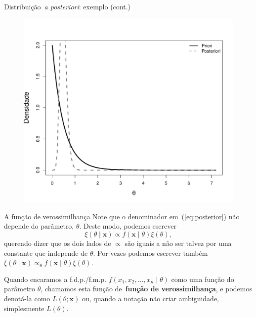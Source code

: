 \begin{frame}{Distribuição~\textit{a posteriori}: exemplo (cont.)}
    \begin{figure}[!ht]
    \label{fig:posterior_componentes}
    \begin{center}
    \includegraphics[scale=0.4]{figures/posterior_componentes.pdf} 
    \end{center} 
    \end{figure} 
\end{frame}
\begin{frame}{A função de verossimilhança}
 Note que o denominador em~(\ref{eq:posterior}) não depende do parâmetro, $\theta$.
 Deste modo, podemos escrever
 \[ \xi(\theta \mid \boldsymbol{x}) \propto f(\boldsymbol{x} \mid \theta)\xi(\theta), \]
 querendo dizer que os dois lados de $\propto$ são iguais a não ser talvez por uma constante que independe de $\theta$.
 Por vezes podemos escrever também $\xi(\theta \mid \boldsymbol{x}) \propto_\theta f(\boldsymbol{x} \mid \theta)\xi(\theta)$.
 \begin{defn}
 \label{def:likelihood_function}
  Quando encaramos a f.d.p./f.m.p. $f(x_1, x_2, \ldots, x_n \mid \theta)$ como uma função do parâmetro $\theta$, chamamos esta função de~\textbf{função de verossimilhança}, e podemos denotá-la como $L(\theta ; \boldsymbol{x})$ ou, quando a notação não criar ambiguidade, simplesmente $L(\theta)$.
 \end{defn}
\end{frame}
